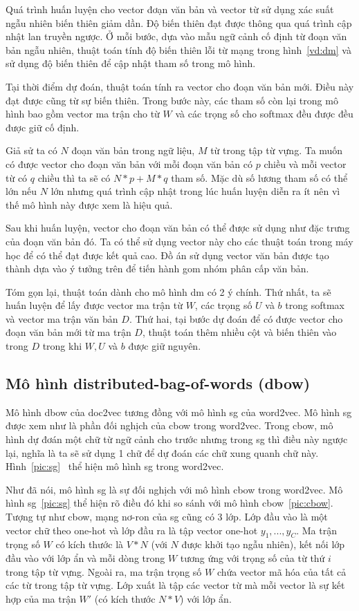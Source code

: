 Quá trình huấn luyện cho vector đơạn văn bản và vector từ sử dụng xác suất ngẫu nhiên biến thiên giảm dần.
Độ biến thiên đạt được thông qua quá trình cập nhật lan truyền ngược.
Ở mỗi bước, dựa vào mẫu ngữ cảnh cố định từ đoạn văn bản ngẫu nhiên, thuật toán tính độ biến thiên lỗi từ mạng trong hình~\ref{vd:dm} và sử dụng độ biến thiên để cập nhật tham số trong mô hình.

Tại thời điểm dự đoán, thuật toán tính ra vector cho đoạn văn bản mới.
Điều này đạt được cũng từ sự biến thiên.
Trong bước này, các tham số còn lại trong mô hình bao gồm vector ma trận cho từ $W$ và các trọng số cho softmax đều được đều được giữ cố định.

Giả sử ta có $N$ đoạn văn bản trong ngữ liệu, $M$ từ trong tập từ vựng.
Ta muốn có được vector cho đoạn văn bản với mỗi đoạn văn bản có $p$ chiều và mỗi vector từ có $q$ chiều thì ta sẽ có $N * p + M * q$ tham số.
Mặc dù số lương tham số có thể lớn nếu $N$ lớn nhưng quá trình cập nhật trong lúc huấn luyện diễn ra ít nên vì thế mô hình này được xem là hiệu quả.

Sau khi huấn luyện, vector cho đoạn văn bản có thể được sử dụng như đặc trưng của đoạn văn bản đó.
Ta có thể sử dụng vector này cho các thuật toán trong máy học để có thể đạt được kết quả cao.
Đồ án sử dụng vector văn bản được tạo thành dựa vào ý tưởng trên để tiến hành gom nhóm phân cấp văn bản.

Tóm gọn lại, thuật toán dành cho mô hình dm có 2 ý chính.
Thứ nhất, ta sẽ huấn luyện để lấy được vector ma trận từ $W$, các trọng số $U$ và $b$ trong softmax và vector ma trận văn bản $D$.
Thứ hai, tại bước dự đoán để có được vector cho đoạn văn bản mới từ ma trận $D$, thuật toán thêm nhiều cột và biến thiên vào trong $D$ trong khi $W, U$ và $b$ được giữ nguyên.

\subsection{Mô hình distributed-bag-of-words (dbow)}
Mô hình dbow của doc2vec tương đồng với mô hình sg của word2vec.
Mô hình sg được xem như là phần đối nghịch của cbow trong word2vec.
Trong cbow, mô hình dự đơán một chữ từ ngữ cảnh cho trước nhưng trong sg thì điều này ngược lại, nghĩa là ta sẽ sử dụng 1 chữ để dự đoán các chữ xung quanh chữ này.
Hình~\ref{pic:sg}~\cite{word2vec-sg} thể hiện mô hình sg trong word2vec.

Như đã nói, mô hình sg là sự đối nghịch với mô hình cbow trong word2vec.
Mô hình sg~\ref{pic:sg} thể hiện rõ điều đó khi so sánh với mô hình cbow~\ref{pic:cbow}.
Tượng tự như cbow, mạng nơ-ron của sg cũng có 3 lớp.
Lớp đầu vào là một vector chữ theo one-hot và lớp đầu ra là tập vector one-hot $y_1, ..., y_C$.
Ma trận trọng số $W$ có kích thước là $V * N$ (với $N$ được khởi tạo ngẫu nhiên), kết nối lớp đầu vào với lớp ẩn và mỗi dòng trong $W$ tương ứng với trọng số của từ thứ $i$ trong tập từ vựng.
Ngoài ra, ma trận trọng số $W$ chứa vector mã hóa của tất cả các từ trong tập từ vựng.
Lớp xuất là tập các vector từ mà mỗi vector là sự kết hợp của ma trận $W'$ (có kích thước $N * V$) với lớp ẩn.

